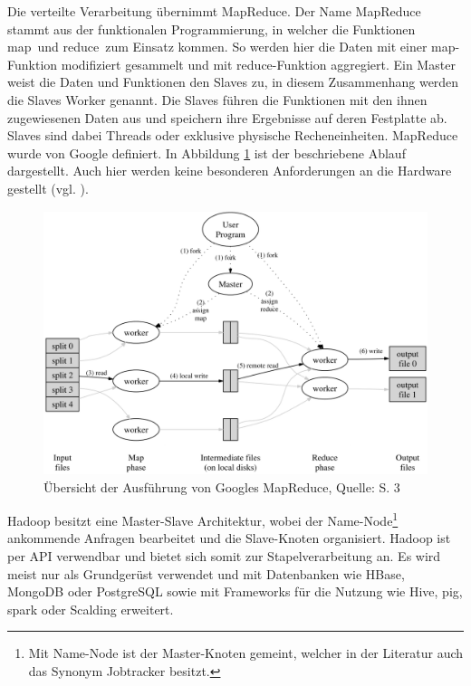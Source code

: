 Die verteilte Verarbeitung übernimmt MapReduce.
Der Name MapReduce stammt aus der funktionalen Programmierung, in welcher die Funktionen \glqq map\grqq \ und \glqq reduce\grqq \ zum Einsatz kommen.
So werden hier die Daten mit einer map-Funktion modifiziert gesammelt und mit reduce-Funktion aggregiert.
Ein Master weist die Daten und Funktionen den Slaves zu, in diesem Zusammenhang werden die Slaves Worker genannt.
Die Slaves führen die Funktionen mit den ihnen zugewiesenen Daten aus und speichern ihre Ergebnisse auf deren Festplatte ab.
Slaves sind dabei Threads oder exklusive physische Recheneinheiten.
MapReduce wurde von Google definiert.
In Abbildung \ref{fig:mapreduce} ist der beschriebene Ablauf dargestellt.
Auch hier werden keine besonderen Anforderungen an die Hardware gestellt (vgl. \cite[S.3]{paper:mapreduce}).
%
\begin{figure}[h!]
\centering
\includegraphics[width=\textwidth]{Abbildungen/mapreduce.png}
\caption[Übersicht der Ausführung von Googles MapReduce]{Übersicht der Ausführung von Googles MapReduce, Quelle: \cite{paper:mapreduce} S. 3}
\label{fig:mapreduce}
\end{figure}
Hadoop besitzt eine Master-Slave Architektur, wobei der Name-Node\footnote{Mit Name-Node ist der Master-Knoten gemeint, welcher in der Literatur auch das Synonym Jobtracker besitzt.} ankommende Anfragen bearbeitet und die Slave-Knoten organisiert.
Hadoop ist per API verwendbar und bietet sich somit zur Stapelverarbeitung an. %
Es wird meist nur als Grundgerüst verwendet und mit Datenbanken wie HBase, MongoDB oder PostgreSQL sowie mit Frameworks für die Nutzung wie Hive, \Gls{pig}, \Gls{spark} oder Scalding erweitert.


